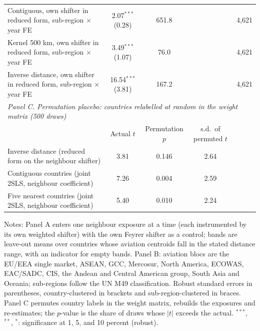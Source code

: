 \begin{table}[htbp]
\begin{threeparttable}
\begin{tabular}{lcccc}
  Contiguous, own shifter in reduced form, sub-region $\times$ year FE & 2.07$^{***}$ (0.28) & 651.8 & & 4,621 \\
  Kernel 500 km, own shifter in reduced form, sub-region $\times$ year FE & 3.49$^{***}$ (1.07) & 76.0 & & 4,621 \\
  Inverse distance, own shifter in reduced form, sub-region $\times$ year FE & 16.54$^{***}$ (3.81) & 167.2 & & 4,621 \\
\midrule
\multicolumn{5}{l}{\textit{Panel C. Permutation placebo: countries relabelled at random in the weight matrix (500 draws)}} \\
 & Actual $t$ & Permutation $p$ & s.d.\ of permuted $t$ & \\
  Inverse distance (reduced form on the neighbour shifter) & 3.81 & 0.146 & 2.64 & \\
  Contiguous countries (joint 2SLS, neighbour coefficient) & 7.26 & 0.004 & 2.59 & \\
  Five nearest countries (joint 2SLS, neighbour coefficient) & 5.40 & 0.010 & 2.24 & \\
\bottomrule
\end{tabular}
\begin{tablenotes}[flushleft]
\scriptsize
\item Notes: Panel A enters one neighbour exposure at a time (each instrumented by its own weighted shifter) with the own Feyrer shifter as a control; bands are leave-out means over countries whose aviation centroids fall in the stated distance range, with an indicator for empty bands. Panel B: aviation blocs are the EU/EEA single market, ASEAN, GCC, Mercosur, North America, ECOWAS, EAC/SADC, CIS, the Andean and Central American group, South Asia and Oceania; sub-regions follow the UN M49 classification. Robust standard errors in parentheses, country-clustered in brackets and sub-region-clustered in braces. Panel C permutes country labels in the weight matrix, rebuilds the exposures and re-estimates; the $p$-value is the share of draws whose $|t|$ exceeds the actual. $^{***}$, $^{**}$, $^{*}$: significance at 1, 5, and 10 percent (robust).
\end{tablenotes}
\end{threeparttable}
\end{table}
